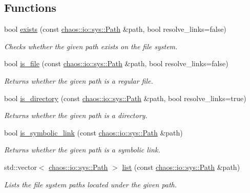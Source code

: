 \subsection*{Functions}
\begin{DoxyCompactItemize}
\item 
bool \hyperlink{namespacechaos_1_1io_1_1sys_ae8f4abc1388c24e0ce7a655a50cd0212}{exists} (const \hyperlink{classchaos_1_1io_1_1sys_1_1_path}{chaos\-::io\-::sys\-::\-Path} \&path, bool resolve\-\_\-links=false)
\begin{DoxyCompactList}\small\item\em Checks whether the given path exists on the file system. \end{DoxyCompactList}\item 
bool \hyperlink{namespacechaos_1_1io_1_1sys_a2afa9dc6f049b03265731be671dbcb17}{is\-\_\-file} (const \hyperlink{classchaos_1_1io_1_1sys_1_1_path}{chaos\-::io\-::sys\-::\-Path} \&path, bool resolve\-\_\-links=false)
\begin{DoxyCompactList}\small\item\em Returns whether the given path is a regular file. \end{DoxyCompactList}\item 
bool \hyperlink{namespacechaos_1_1io_1_1sys_ad48945ad68ee4c84a37240ebc6b5a167}{is\-\_\-directory} (const \hyperlink{classchaos_1_1io_1_1sys_1_1_path}{chaos\-::io\-::sys\-::\-Path} \&path, bool resolve\-\_\-links=true)
\begin{DoxyCompactList}\small\item\em Returns whether the given path is a directory. \end{DoxyCompactList}\item 
bool \hyperlink{namespacechaos_1_1io_1_1sys_ac47b8476aea536b08a1c7a34b4e7e28c}{is\-\_\-symbolic\-\_\-link} (const \hyperlink{classchaos_1_1io_1_1sys_1_1_path}{chaos\-::io\-::sys\-::\-Path} \&path)
\begin{DoxyCompactList}\small\item\em Returns whether the given path is a symbolic link. \end{DoxyCompactList}\item 
std\-::vector$<$ \hyperlink{classchaos_1_1io_1_1sys_1_1_path}{chaos\-::io\-::sys\-::\-Path} $>$ \hyperlink{namespacechaos_1_1io_1_1sys_a21398064d60d0d4ac225a2c5004adf06}{list} (const \hyperlink{classchaos_1_1io_1_1sys_1_1_path}{chaos\-::io\-::sys\-::\-Path} \&path)
\begin{DoxyCompactList}\small\item\em Lists the file system paths located under the given path. \end{DoxyCompactList}\item 

\end{DoxyCompactItemize}
